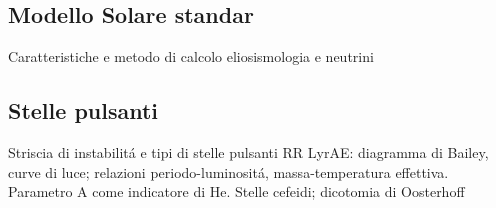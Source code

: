 \subsection{Modello Solare standar}

\begin{frame}{Caratteristiche e metodo di calcolo}
eliosismologia e neutrini
\end{frame}

\subsection{Stelle pulsanti}

\begin{frame}{Striscia di instabilit\'a e tipi di stelle pulsanti}
RR LyrAE: diagramma di Bailey, curve di luce; relazioni periodo-luminosit\'a, massa-temperatura effettiva.
Parametro A come indicatore di He.
Stelle cefeidi; dicotomia di Oosterhoff
\end{frame}